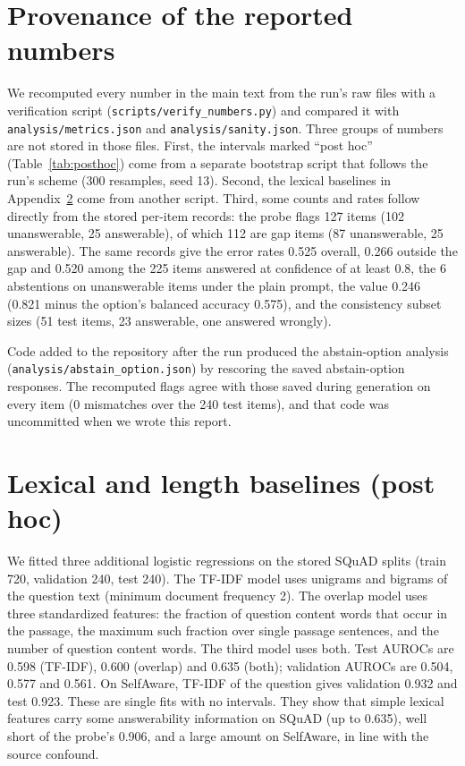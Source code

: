 \documentclass[10pt]{article}
\newcommand{\code}[1]{\texttt{#1}}
\begin{document}
\section{Provenance of the reported numbers}\label{app:posthoc}
\begingroup\sloppy
We recomputed every number in the main text from the run's raw files with a verification script (\code{scripts/verify\_numbers.py}) and compared it with \code{analysis/metrics.json} and \code{analysis/sanity.json}. Three groups of numbers are not stored in those files. First, the intervals marked ``post hoc'' (Table~\ref{tab:posthoc}) come from a separate bootstrap script that follows the run's scheme (300 resamples, seed 13). Second, the lexical baselines in Appendix~\ref{app:lexical} come from another script. Third, some counts and rates follow directly from the stored per-item records: the probe flags 127 items (102 unanswerable, 25 answerable), of which 112 are gap items (87 unanswerable, 25 answerable). The same records give the error rates 0.525 overall, 0.266 outside the gap and 0.520 among the 225 items answered at confidence of at least 0.8, the 6 abstentions on unanswerable items under the plain prompt, the value 0.246 (0.821 minus the option's balanced accuracy 0.575), and the consistency subset sizes (51 test items, 23 answerable, one answered wrongly).

Code added to the repository after the run produced the abstain-option analysis (\code{analysis/abstain\_option.json}) by rescoring the saved abstain-option responses. The recomputed flags agree with those saved during generation on every item (0 mismatches over the 240 test items), and that code was uncommitted when we wrote this report.

\endgroup
\section{Lexical and length baselines (post hoc)}\label{app:lexical}
We fitted three additional logistic regressions on the stored SQuAD splits (train 720, validation 240, test 240). The TF-IDF model uses unigrams and bigrams of the question text (minimum document frequency 2). The overlap model uses three standardized features: the fraction of question content words that occur in the passage, the maximum such fraction over single passage sentences, and the number of question content words. The third model uses both. Test AUROCs are 0.598 (TF-IDF), 0.600 (overlap) and 0.635 (both); validation AUROCs are 0.504, 0.577 and 0.561. On SelfAware, TF-IDF of the question gives validation 0.932 and test 0.923. These are single fits with no intervals. They show that simple lexical features carry some answerability information on SQuAD (up to 0.635), well short of the probe's 0.906, and a large amount on SelfAware, in line with the source confound.
\end{document}
